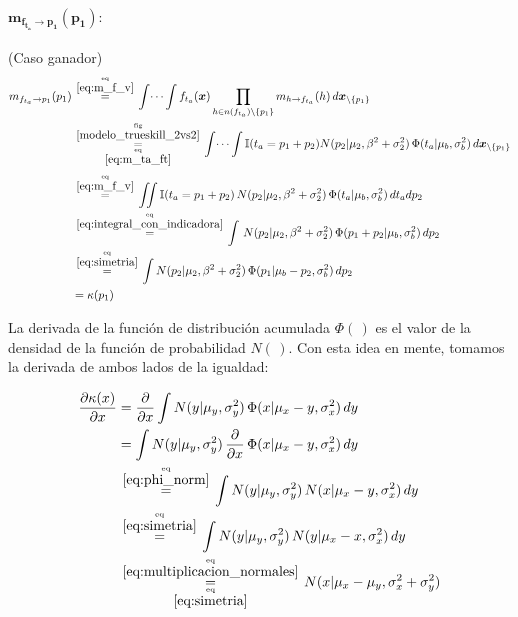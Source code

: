 \documentclass[article]{jss}
\newcommand\hfrac[2]{\genfrac{}{}{0pt}{}{#1}{#2}} %
\begin{document}
\begin{appendix}
\paragraph{$\bm{m_{f_{t_a} \rightarrow p_1}(p_1)}:$} (Caso ganador)
\begin{equation}\label{eq:m_fta_p_inicial}
\begin{split}
m_{f_{t_a} \rightarrow p_1}(p_1)  &\overset{\hfrac{\text{eq}}{\ref{eq:m_f_v}}}{=} \int \dots \int f_{t_a}(\bm{x}) \prod_{h \in n(f_{t_a}) \setminus \{p_1\} } m_{h \rightarrow f_{t_a}}(h) \, d\bm{x}_{\setminus \{p_1\} }  \\
&\overset{\hfrac{\text{fig}}{\ref{modelo_trueskill_2vs2}}}{\underset{\hfrac{\text{eq}}{\ref{eq:m_ta_ft}}}{=}} \int \dots \int \mathbb{I}( t_a = p_1 + p_2) N(p_2| \mu_2, \beta^2 + \sigma_2^2 ) \, \Phi (t_a| \mu_b , \sigma_b^2 ) \, d\bm{x}_{\setminus \{p_1\} }\\[0.1cm]
&\overset{\hfrac{\text{eq}}{\ref{eq:m_f_v}}}{=} \iint \mathbb{I}( t_a = p_1 + p_2) \, N(p_2| \mu_2, \beta^2 + \sigma_2^2 ) \, \Phi (t_a| \mu_b , \sigma_b^2 ) \, dt_a dp_2 \\
&\overset{\hfrac{\text{eq}}{\ref{eq:integral_con_indicadora}}}{=} \int  \, N(p_2| \mu_2, \beta^2 + \sigma_2^2 ) \, \Phi (p_1 + p_2| \mu_b , \sigma_b^2 ) \, dp_2 \\
&\overset{\hfrac{\text{eq}}{\ref{eq:simetria}}}{=} \int  N(p_2| \mu_2, \beta^2 + \sigma_2^2 ) \, \Phi (p_1 | \mu_b - p_2 , \sigma_b^2) \, dp_2 \\
&= \kappa(p_1)
\end{split}
\end{equation}

La derivada de la funci\'on de distribuci\'on acumulada $\Phi(\,)$ es el valor de la densidad de la funci\'on de probabilidad $N(\,)$. Con esta idea en mente, tomamos la derivada de ambos lados de la igualdad:

\begin{equation}\label{eq:ta-p_derivada}
\begin{split}
\frac{\partial\kappa(x)}{\partial x} &= \frac{\partial}{\partial x} \int  N(y| \mu_y, \sigma_y^2 ) \,   \Phi (x | \mu_x -y , \sigma_x^2 ) \, dy \\
&= \int  N(y| \mu_y, \sigma_y^2 ) \, \frac{\partial}{\partial x} \,\Phi (x| \mu_x - y, \sigma_x^2 )  \, dy   \\
& \overset{\hfrac{\text{eq}}{\ref{eq:phi_norm}}}{=} \int  N(y| \mu_y, \sigma_y^2 ) \, N(x| \mu_x -y , \sigma_x^2)  \, dy  \\
& \overset{\hfrac{\text{eq}}{\ref{eq:simetria}}}{=} \int  N(y| \mu_y, \sigma_y^2 ) \, N(y| \mu_x  -x , \sigma_x^2)  \, dy  \\
&\overset{\hfrac{\text{eq}}{\ref{eq:multiplicacion_normales}}}{\underset{\hfrac{\text{eq}}{\ref{eq:simetria}}}{=}} N(x| \mu_x - \mu_y, \sigma_x^2 + \sigma_y^2)
\end{split}
\end{equation}


\end{appendix}
\end{document}
